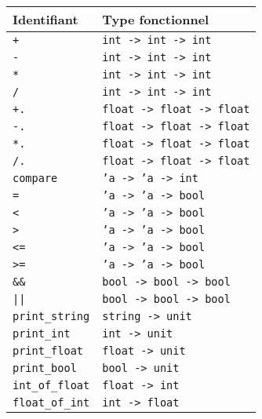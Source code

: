 \documentclass[paper=a4, fontsize=11pt]{scrartcl}
\numberwithin{equation}{section}		%
\numberwithin{figure}{section}			%
\numberwithin{table}{section}				%
\begin{document}
\begin{center}
\begin{tabular}{ | l | p{4.7cm} | }
    \hline
\textnormal{\textbf{Identifiant}}  &  \textnormal{\textbf{Type fonctionnel}}  \\ \hline

\texttt{+}              & \texttt{int -> int -> int}        \\ \hline
\texttt{-}              & \texttt{int -> int -> int}        \\ \hline
\texttt{*}              & \texttt{int -> int -> int}        \\ \hline
\texttt{/}              & \texttt{int -> int -> int}        \\ \hline

\texttt{+.}             & \texttt{float -> float -> float}  \\ \hline
\texttt{-.}             & \texttt{float -> float -> float}  \\ \hline
\texttt{*.}             & \texttt{float -> float -> float}  \\ \hline
\texttt{/.}             & \texttt{float -> float -> float}  \\ \hline
    
\texttt{compare}        & \texttt{'a -> 'a -> int}          \\ \hline
\texttt{=}              & \texttt{'a -> 'a -> bool}         \\ \hline
\texttt{<}              & \texttt{'a -> 'a -> bool}         \\ \hline
\texttt{>}              & \texttt{'a -> 'a -> bool}         \\ \hline
\texttt{<=}             & \texttt{'a -> 'a -> bool}         \\ \hline
\texttt{>=}             & \texttt{'a -> 'a -> bool}         \\ \hline
    
\texttt{\&\&}           & \texttt{bool -> bool -> bool}     \\ \hline
\texttt{||}             & \texttt{bool -> bool -> bool}     \\ \hline

\texttt{print\_string}  & \texttt{string -> unit}           \\ \hline
\texttt{print\_int}     & \texttt{int -> unit}              \\ \hline
\texttt{print\_float}   & \texttt{float -> unit}            \\ \hline
\texttt{print\_bool}    & \texttt{bool -> unit}             \\ \hline

\texttt{int\_of\_float} & \texttt{float -> int}             \\ \hline
\texttt{float\_of\_int} & \texttt{int -> float}             \\ \hline

\end{tabular}
\end{center}
\end{document}
